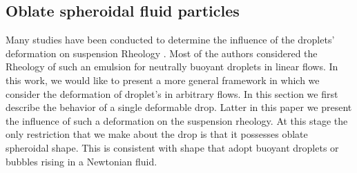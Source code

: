 \subsection{Oblate spheroidal fluid particles}

Many studies have been conducted to determine the influence of the droplets' deformation on suspension Rheology \citet{goddard1967nonlinear,lhuillier1987phenomenology,maffettone1998equation}.
Most of the authors considered the Rheology of such an emulsion for neutrally buoyant droplets in linear flows. 
In this work, we would like to present a more general framework in which we consider the deformation of droplet's in arbitrary flows. 
In this section we first describe the behavior of a single deformable drop. 
Latter in this paper we present the influence of such a deformation on the suspension rheology. 
At this stage the only restriction that we make about the drop is that it possesses oblate spheroidal shape. 
This is consistent with shape that adopt buoyant droplets or bubbles rising in a Newtonian fluid. 

